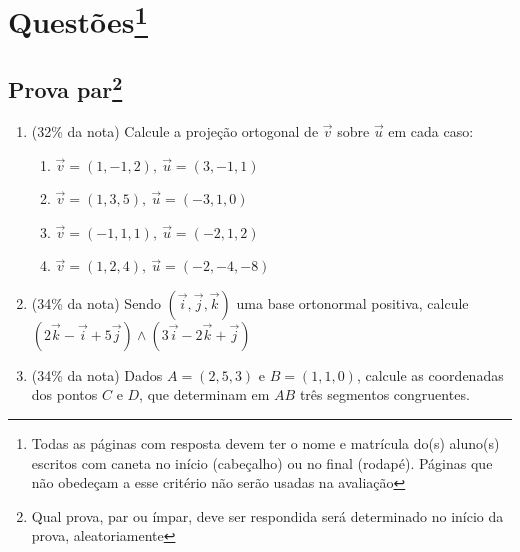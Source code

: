 \documentclass[12pt,a4paper,brazilian, fleqn]{article}
\newcommand{\ratio}[1]{(#1\% da nota)}
\renewcommand{\vec}[1]{\overrightarrow{#1}}
\begin{document}
\section*{
    \centering Questões\footnote{Todas as páginas com resposta devem ter o nome e matrícula do(s) aluno(s)
        escritos com caneta no início (cabeçalho) ou no final (rodapé). Páginas
        que não obedeçam a esse critério não serão usadas na avaliação
    }
}

\subsection*{Prova par\footnote{Qual prova, par ou ímpar, deve ser respondida será determinado no início da prova, aleatoriamente}}

\begin{enumerate}
    \item \ratio{32} Calcule a projeção ortogonal de \(\vec{v}\) sobre \(\vec{u}\) em cada caso:
        \begin{enumerate}
            \item \(\vec{v}=(1,-1,2), ~\vec{u}=(3,-1,1)\)
            \item \(\vec{v}=(1,3,5), ~\vec{u}=(-3,1,0)\)
            \item \(\vec{v}=(-1,1,1), ~\vec{u}=(-2,1,2)\)
            \item \(\vec{v}=(1,2,4), ~\vec{u}=(-2,-4,-8)\)
        \end{enumerate}
    \item \ratio{34} Sendo \((\vec{i},\vec{j},\vec{k})\) uma base ortonormal positiva, calcule
        \(
        (2\vec{k} - \vec{i} +5 \vec{j}) \wedge (3 \vec{i} - 2 \vec{k} + \vec{j})
        \)

    \item \ratio{34} Dados \(A=(2,5,3)\) e \(B=(1,1,0)\), calcule as coordenadas dos pontos \(C\) e \(D\),
        que determinam em \(AB\) três segmentos congruentes.
\end{enumerate}
\end{document}
